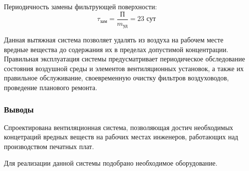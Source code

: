 Периодичность замены фильтрующей поверхности:
$$
    \tau_\text{зам} = \frac{\text{П}}{m_\text{уд}} = 23 \text{ сут}
$$

Данная вытяжная система позволяет удалять из воздуха на рабочем месте вредные
вещества до содержания их в пределах допустимой концентрации. Правильная эксплуатация
системы предусматривает периодическое обследование состояния воздушной среды и
элементов вентиляционных установок, а также их правильное обслуживание, своевременную
очистку фильтров воздуховодов, проведение планового ремонта.

\subsubsection{Выводы}

Спроектирована вентиляционная система, позволяющая достич необходимых концетраций
вредных веществ на рабочих местах инженеров, работающих над производством печатных плат.

Для реализации данной системы подобрано необходимое оборудование.
